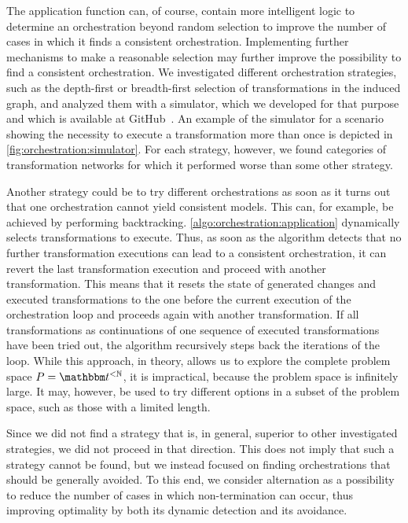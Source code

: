 The application function can, of course, contain more intelligent logic to determine an orchestration beyond random selection to improve the number of cases in which it finds a consistent orchestration.
Implementing further mechanisms to make a reasonable selection may further improve the possibility to find a consistent orchestration.
We investigated different orchestration strategies, such as the depth-first or breadth-first selection of transformations in the induced graph, and analyzed them with a simulator, which we developed for that purpose and which is available at GitHub~.
An example of the simulator for a scenario showing the necessity to execute a transformation more than once is depicted in \autoref{fig:orchestration:simulator}.
For each strategy, however, we found categories of transformation networks for which it performed worse than some other strategy.

Another strategy could be to try different orchestrations as soon as it turns out that one orchestration cannot yield consistent models.
This can, for example, be achieved by performing backtracking.
\autoref{algo:orchestration:application} dynamically selects transformations to execute. 
Thus, as soon as the algorithm detects that no further transformation executions can lead to a consistent orchestration, it can revert the last transformation execution and proceed with another transformation.
This means that it resets the state of generated changes and executed transformations to the one before the current execution of the orchestration loop and proceeds again with another transformation.
If all transformations as continuations of one sequence of executed transformations have been tried out, the algorithm recursively steps back the iterations of the loop.
While this approach, in theory, allows us to explore the complete problem space $P = \transformationset{T}^{< \mathbb{N}}$, it is impractical, because the problem space is infinitely large.
It may, however, be used to try different options in a subset of the problem space, such as those with a limited length.

Since we did not find a strategy that is, in general, superior to other investigated strategies, we did not proceed in that direction.
This does not imply that such a strategy cannot be found, but we instead focused on finding orchestrations that should be generally avoided.
To this end, we consider alternation as a possibility to reduce the number of cases in which non-termination can occur, thus improving optimality by both its dynamic detection and its avoidance.


